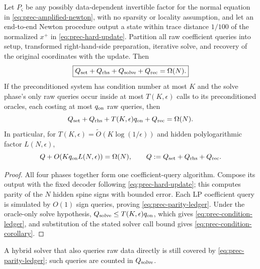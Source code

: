 \begin{theorem}
\label{thm:prec-parity-ledger}
Let $P_\varsigma$ be any possibly data-dependent invertible factor for the
normal equation in \eqref{eq:prec-amplified-newton}, with no sparsity or locality
assumption, and let an end-to-end Newton procedure output a state within trace
distance $1/100$ of the normalized $x^+$ in
\eqref{eq:prec-hard-update}.  Partition all raw coefficient queries into
setup, transformed right-hand-side preparation, iterative solve, and
recovery of the original coordinates with the update.  Then
\begin{equation}
 \boxed{Q_{\rm set}+Q_{\rm rhs}+Q_{\rm solve}+Q_{\rm rec}=\Omega(N).}
 \label{eq:prec-parity-ledger}
\end{equation}
If the preconditioned system has condition number at most $K$ and the solve phase's
only raw queries occur inside at most $T(K,\epsilon)$ calls to its
preconditioned oracles, each costing at most $q_{\rm on}$ raw queries, then
\begin{equation}
 Q_{\rm set}+Q_{\rm rhs}+T(K,\epsilon)q_{\rm on}+Q_{\rm rec}=\Omega(N).
 \label{eq:prec-condition-ledger}
\end{equation}
In particular, for
$T(K,\epsilon)=\widetilde O(K\log(1/\epsilon))$ and hidden polylogarithmic
factor $L(N,\epsilon)$,
\begin{equation}
 Q+O(Kq_{\rm on}L(N,\epsilon))=\Omega(N),\qquad
 Q:=Q_{\rm set}+Q_{\rm rhs}+Q_{\rm rec}.                 \label{eq:prec-condition-corollary}
\end{equation}
\end{theorem}

\begin{proof}
All four phases together form one coefficient-query algorithm.  Compose its
output with the fixed decoder following \eqref{eq:prec-hard-update}; this
computes parity of the $N$ hidden spine signs with bounded error.  Each LP
coefficient query is simulated by $O(1)$ sign queries, proving
\eqref{eq:prec-parity-ledger}.  Under the oracle-only solve hypothesis,
$Q_{\rm solve}\leq T(K,\epsilon)q_{\rm on}$, which gives
\eqref{eq:prec-condition-ledger}, and substitution of the stated solver call
bound gives \eqref{eq:prec-condition-corollary}.
\end{proof}

A hybrid solver that also queries raw data directly is still covered by
\eqref{eq:prec-parity-ledger}; such queries are counted in $Q_{\rm solve}$.

